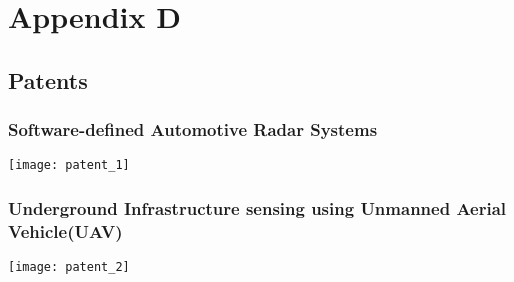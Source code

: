 \chapter{Appendix D}
\section{Patents}
\newpage
\subsection{Software-defined Automotive Radar Systems}
\begin{center}
	\texttt{[image: patent\_1]}
\end{center}
\newpage
\subsection{Underground Infrastructure sensing using Unmanned Aerial Vehicle(UAV)}
\newpage
\begin{center}
	\texttt{[image: patent\_2]}
\end{center}